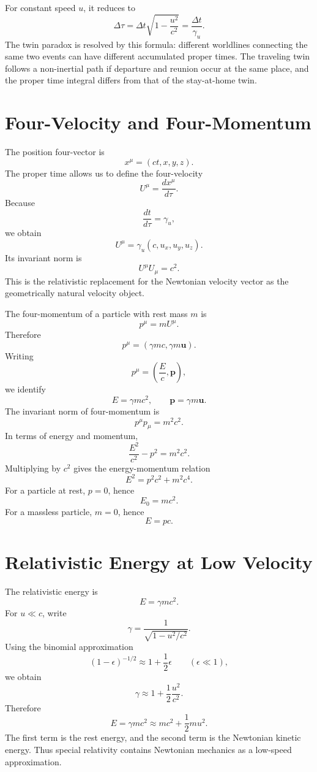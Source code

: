 For constant speed \(u\), it reduces to
\[
\Delta\tau=\Delta t\sqrt{1-\frac{u^2}{c^2}}
=\frac{\Delta t}{\gamma_u}.
\]
The twin paradox is resolved by this formula: different worldlines connecting
the same two events can have different accumulated proper times.  The traveling
twin follows a non-inertial path if departure and reunion occur at the same
place, and the proper time integral differs from that of the stay-at-home twin.

\clearpage

\section{Four-Velocity and Four-Momentum}

The position four-vector is
\[
x^\mu=(ct,x,y,z).
\]
The proper time allows us to define the four-velocity
\[
U^\mu=\frac{dx^\mu}{d\tau}.
\]
Because
\[
\frac{dt}{d\tau}=\gamma_u,
\]
we obtain
\[
U^\mu=\gamma_u(c,u_x,u_y,u_z).
\]
Its invariant norm is
\[
U^\mu U_\mu=c^2.
\]
This is the relativistic replacement for the Newtonian velocity vector as the
geometrically natural velocity object.

The four-momentum of a particle with rest mass \(m\) is
\[
p^\mu=mU^\mu.
\]
Therefore
\[
p^\mu=(\gamma mc,\gamma m\mathbf{u}).
\]
Writing
\[
p^\mu=\left(\frac{E}{c},\mathbf{p}\right),
\]
we identify
\[
E=\gamma mc^2,
\qquad
\mathbf{p}=\gamma m\mathbf{u}.
\]
The invariant norm of four-momentum is
\[
p^\mu p_\mu=m^2c^2.
\]
In terms of energy and momentum,
\[
\frac{E^2}{c^2}-p^2=m^2c^2.
\]
Multiplying by \(c^2\) gives the energy-momentum relation
\[
\boxed{E^2=p^2c^2+m^2c^4.}
\]
For a particle at rest, \(p=0\), hence
\[
\boxed{E_0=mc^2.}
\]
For a massless particle, \(m=0\), hence
\[
E=pc.
\]

\clearpage

\section{Relativistic Energy at Low Velocity}

The relativistic energy is
\[
E=\gamma mc^2.
\]
For \(u\ll c\), write
\[
\gamma=\frac{1}{\sqrt{1-u^2/c^2}}.
\]
Using the binomial approximation
\[
(1-\epsilon)^{-1/2}\approx 1+\frac{1}{2}\epsilon
\qquad (\epsilon\ll1),
\]
we obtain
\[
\gamma\approx 1+\frac{1}{2}\frac{u^2}{c^2}.
\]
Therefore
\[
E=\gamma mc^2
\approx mc^2+\frac{1}{2}mu^2.
\]
The first term is the rest energy, and the second term is the Newtonian kinetic
energy.  Thus special relativity contains Newtonian mechanics as a low-speed
approximation.

